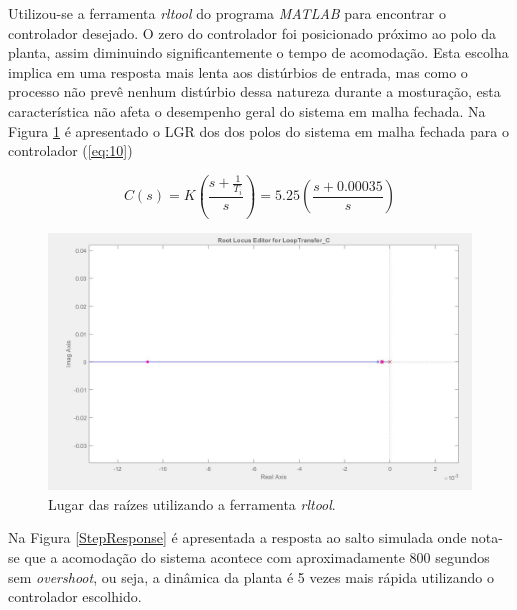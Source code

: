 Utilizou-se a ferramenta \textit{rltool} do programa \textit{MATLAB} para encontrar o controlador desejado. O zero do controlador foi posicionado próximo ao polo da planta, assim diminuindo significantemente o tempo de acomodação. Esta escolha implica em uma resposta mais lenta aos distúrbios de entrada, mas como o processo não prevê nenhum distúrbio dessa natureza durante a mosturação, esta característica não afeta o desempenho geral do sistema em malha fechada. Na Figura \ref{RootLocus} é apresentado o LGR dos dos polos do sistema em malha fechada para o controlador (\ref{eq:10})
 
\begin{equation}
	\label{eq:10}
	C(s)=K(\frac{s+\frac{1}{T_i}}{s}) = 5.25(\frac{s+0.00035}{s})  
\end{equation}

\begin{figure}[htb]
	\caption{\label{RootLocus}Lugar das raízes utilizando a ferramenta \textit{rltool}.}
	\begin{center}
	    \includegraphics[width=0.85\linewidth]{./img/RootLocus.jpg}
	\end{center}
\end{figure}

Na Figura \ref{StepResponse} é apresentada a resposta ao salto simulada onde nota-se que a acomodação do sistema acontece com aproximadamente 800 segundos sem \textit{overshoot}, ou seja, a dinâmica da planta é 5 vezes mais rápida utilizando o controlador escolhido. 

